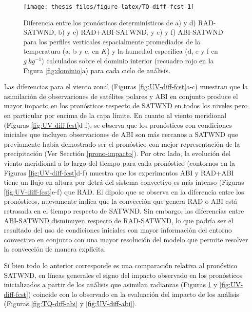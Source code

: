 \documentclass[12pt,oneside,a4paper]{reedthesis}
\begin{document}
\begin{figure}

{\centering \texttt{[image: thesis\_files/figure-latex/TQ-diff-fcst-1]} 

}

\caption{Diferencia entre los pronósticos determinísticos de a) y d) RAD-SATWND, b) y e) RAD+ABI-SATWND, y c) y f) ABI-SATWND para los perfiles verticales espacialmente promediados de la temperatura (a, b y c, en \(K\)) y la humedad específica (d, e y f en \(g\ kg^{-1}\)) calculados sobre el dominio interior (recuadro rojo en la Figura \ref{fig:dominio}a) para cada ciclo de análisis.}\label{fig:TQ-diff-fcst}
\end{figure}
Las diferencias para el viento zonal (Figuras \ref{fig:UV-diff-fcst}a-c) muestran que la asimilación de observaciones de satélites polares y ABI en conjunto produce el mayor impacto en los pronósticos respecto de SATWND en todos los niveles pero en particular por encima de la capa límite. En cuanto al viento meridional (Figuras \ref{fig:UV-diff-fcst}d-f), se observa que los pronósticos con condiciones iniciales que incluyen observaciones de ABI son más cercanos a SATWND que previamente había demostrado ser el pronóstico con mejor representación de la precipitación (Ver Secctión \ref{prono-impacto}). Por otro lado, la evolución del viento meridional a lo largo del tiempo para cada pronóstico (contornos en la Figuras \ref{fig:UV-diff-fcst}d-f) muestra que los experimentos ABI y RAD+ABI tiene un flujo en altura por detrá del sistema convectivo es más intenso (Figuras \ref{fig:UV-diff-fcst}e-f) que RAD. El dipolo que se observa en la diferencia entre los pronósticos, nuevamente indica que la convección que genera RAD o ABI está retrasada en el tiempo respecto de SATWND. Sin embargo, las diferencias entre ABI-SATWND disminuyen respecto de RAD-SATWND, lo que podría ser el resultado del uso de condiciones iniciales con mayor información del entorno convectivo en conjunto con una mayor resolución del modelo que permite resolver la convección de manera explicita.

Si bien todo lo anterior corresponde es una comparación relativa al pronóstico SATWND, en líneas generales el signo del impacto observado en los pronósticos inicializados a partir de los análisis que asimilan radianzas (Figuras \ref{fig:TQ-diff-fcst} y \ref{fig:UV-diff-fcst}) coincide con lo observado en la evaluación del impacto de los análisis (Figuras \ref{fig:TQ-diff-abi} y \ref{fig:UV-diff-abi}).
\end{document}
